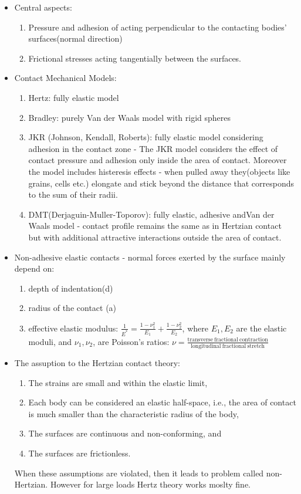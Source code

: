 \documentclass[10pt,a4paper]{article}
\begin{document}
\begin{itemize}
 \item Central aspects:
 \begin{enumerate}
  \item Pressure and adhesion of acting perpendicular to the contacting bodies' surfaces(normal direction)
  \item Frictional stresses acting tangentially between the surfaces.
 \end{enumerate}

 \item Contact Mechanical Models:
 \begin{enumerate}
  \item Hertz: fully elastic model
  \item Bradley: purely Van der Waals model with rigid spheres
  \item JKR (Johnson, Kendall, Roberts): fully elastic model considering adhesion in the contact zone  - The JKR model considers the effect of contact pressure and adhesion only inside the area of contact. 
  Moreover the model includes histeresis effects - when pulled away they(objects like grains, cells etc.) elongate and stick beyond the distance that corresponds to the sum of their radii.
  \item DMT(Derjaguin-Muller-Toporov): fully elastic, adhesive andVan der Waals model -  contact profile remains the same as in Hertzian contact but with additional attractive interactions outside the area of contact.
 \end{enumerate}

 \item Non-adhesive elastic contacts - normal forces exerted by the surface mainly depend on:
 \begin{enumerate}
  \item depth of indentation(d)
  \item radius of the contact (a)
  \item effective elastic modulus: $\frac{1}{E^{*}} = \frac{1-\nu_1^2}{E_1}+\frac{1-\nu_2^2}{E_2}$, where $E_1,E_2$ are the elastic moduli,
  and $\nu_1,\nu_2$, are Poisson's ratios:
  $\nu = \frac{\mathrm{transverse ~ fractional ~ contraction}}{\mathrm{longitudinal ~ fractional ~ stretch}}$
 \end{enumerate}
 \item The assuption to the Hertzian contact theory:
 \begin{enumerate}
  \item The strains are small and within the elastic limit,
  \item Each body can be considered an elastic half-space, i.e., the area of contact is much smaller than the characteristic radius of the body,
  \item The surfaces are continuous and non-conforming, and
  \item The surfaces are frictionless.
 \end{enumerate}
 When these assumptions are violated, then it leads to problem called non-Hertzian. 
 However for large loads Hertz theory works moslty fine.
 

\end{itemize}
\end{document}

